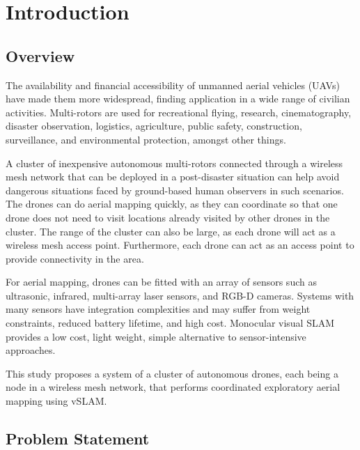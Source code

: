 \setlength{\footskip}{8mm}

\chapter{Introduction}

\textit{  }

\section{Overview}

The availability and financial accessibility of unmanned aerial vehicles (UAVs) have made them more widespread, finding application in a wide range of civilian activities. Multi-rotors are used for recreational flying, research, cinematography, disaster observation, logistics, agriculture,  public safety, construction, surveillance, and environmental protection, amongst other things. 

A cluster of inexpensive autonomous multi-rotors connected through a wireless mesh network that can be deployed in a post-disaster situation can help avoid dangerous situations faced by ground-based human observers in such scenarios. The drones can do aerial mapping quickly, as they can coordinate so that one drone does not need to visit locations already visited by other drones in the cluster. The range of the cluster can also be large, as each drone will act as a wireless mesh access point. Furthermore, each drone can act as an access point to provide connectivity in the area.  

For aerial mapping, drones can be fitted with an array of sensors such as ultrasonic, infrared, multi-array laser sensors, and RGB-D cameras. Systems with many sensors have integration complexities and may suffer from weight constraints, reduced battery lifetime, and high cost. Monocular visual SLAM provides a low cost, light weight, simple alternative to sensor-intensive approaches. 

This study proposes a system of a cluster of autonomous drones, each being a node in a wireless mesh network, that performs coordinated exploratory aerial mapping using vSLAM.

\section{Problem Statement}


